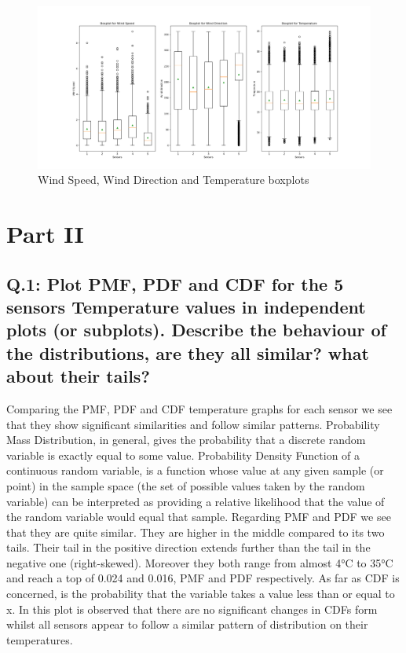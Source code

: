 \documentclass[a4paper]{article}
\begin{document}
        \begin{figure}[H]
            \centering
            \includegraphics[width=\textwidth]{images/Boxplots_for_the_three_variables.png}
            \caption{Wind Speed, Wind Direction and Temperature boxplots}
            \label{fig:Boxplot}
        \end{figure}
        
        
\section{Part II}

        \subsection{Q.1: Plot PMF, PDF and CDF for the 5 sensors Temperature values in independent plots (or subplots). Describe the behaviour of the distributions, are they all similar? what about their tails?}
        
            Comparing the PMF, PDF and CDF temperature graphs for each sensor we see that they show significant similarities and follow similar patterns. 
            Probability Mass Distribution, in general, gives the probability that a discrete random variable is exactly equal to some value. Probability Density Function of a continuous random variable, is a function whose value at any given sample (or point) in the sample space (the set of possible values taken by the random variable) can be interpreted as providing a relative likelihood that the value of the random variable would equal that sample. Regarding PMF and PDF we see that they are quite similar. They are higher in the middle compared to its two tails. Their tail in the positive direction extends further than the tail in the negative one (right-skewed). Moreover they both range from almost 4°C to 35°C and reach a top of 0.024 and 0.016, PMF and PDF respectively.
            As far as CDF is concerned, is the probability that the variable takes a value less than or equal to x. In this plot is observed that there are no significant changes in CDFs form whilst all sensors appear to follow a similar pattern of distribution on their temperatures. 
\end{document}
